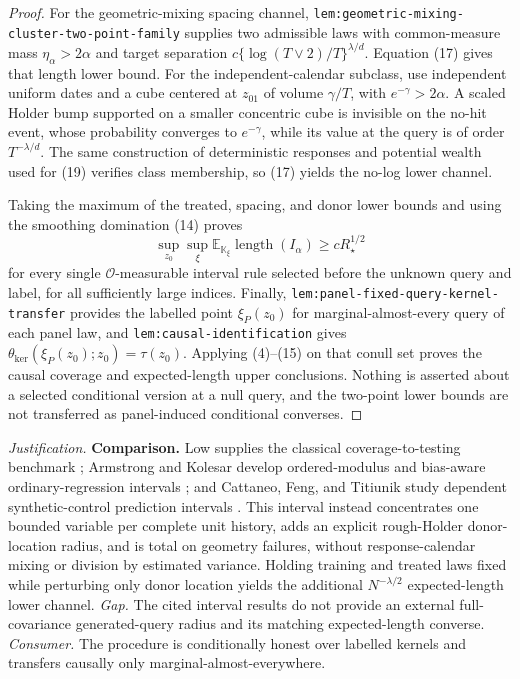 \documentclass{article}
\begin{document}
\begin{proof}
For the geometric-mixing spacing channel,
\texttt{lem:geometric-mixing-cluster-two-point-family} supplies two admissible laws with common-measure mass \(\eta_\alpha>2\alpha\) and target separation
\(c\{\log(T\vee2)/T\}^{\lambda/d}\).  Equation (17) gives that length lower bound.  For the independent-calendar subclass, use independent uniform dates and a cube centered at \(z_{01}\) of volume \(\gamma/T\), with \(e^{-\gamma}>2\alpha\).  A scaled Holder bump supported on a smaller concentric cube is invisible on the no-hit event, whose probability converges to \(e^{-\gamma}\), while its value at the query is of order \(T^{-\lambda/d}\).  The same construction of deterministic responses and potential wealth used for (19) verifies class membership, so (17) yields the no-log lower channel.

Taking the maximum of the treated, spacing, and donor lower bounds and using the smoothing domination (14) proves
\[
 \sup_{z_0}\sup_{\xi}
 \mathbb E_{\mathbb K_\xi}\operatorname{length}(I_\alpha)
 \ge cR_\star^{1/2}                                        \tag{21}
\]
for every single \(\mathcal O\)-measurable interval rule selected before the unknown query and label, for all sufficiently large indices.  Finally, \texttt{lem:panel-fixed-query-kernel-transfer} provides the labelled point \(\xi_P(z_0)\) for marginal-almost-every query of each panel law, and \texttt{lem:causal-identification} gives
\(\theta_{\mathrm{ker}}(\xi_P(z_0);z_0)=\tau(z_0)\).  Applying (4)--(15) on that conull set proves the causal coverage and expected-length upper conclusions.  Nothing is asserted about a selected conditional version at a null query, and the two-point lower bounds are not transferred as panel-induced conditional converses.
\end{proof}
\par\smallskip\noindent \textit{Justification.} \textbf{Comparison.} Low supplies the classical coverage-to-testing benchmark \cite{Low1997}; Armstrong and Kolesar develop ordered-modulus and bias-aware ordinary-regression intervals \cite{ArmstrongKolesar2018,ArmstrongKolesar2020}; and Cattaneo, Feng, and Titiunik study dependent synthetic-control prediction intervals \cite{CattaneoFengTitiunik2021}. This interval instead concentrates one bounded variable per complete unit history, adds an explicit rough-Holder donor-location radius, and is total on geometry failures, without response-calendar mixing or division by estimated variance. Holding training and treated laws fixed while perturbing only donor location yields the additional \(N^{-\lambda/2}\) expected-length lower channel. \textit{Gap.} The cited interval results do not provide an external full-covariance generated-query radius and its matching expected-length converse. \textit{Consumer.} The procedure is conditionally honest over labelled kernels and transfers causally only marginal-almost-everywhere.
\end{document}
